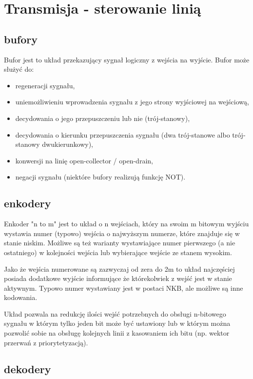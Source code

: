 \documentclass{pdfBooklets}
\begin{document}
\section{Transmisja - sterowanie linią}
\subsection{bufory}

Bufor jest to układ przekazujący sygnał logiczny z wejścia na wyjście. Bufor może służyć do:
\begin{itemize}
\item regeneracji sygnału,
\item uniemożliwieniu wprowadzenia sygnału z jego strony wyjściowej na wejściową,
\item decydowania o jego przepuszczeniu lub nie (trój-stanowy),
\item decydowania o kierunku przepuszczenia sygnału (dwa trój-stanowe albo trój-stanowy dwukierunkowy),
\item konwersji na linię open-collector / open-drain,
\item negacji sygnału (niektóre bufory realizują funkcję NOT).
\end{itemize}

\subsection{enkodery}

Enkoder "n to m" jest to układ o n wejściach, który na swoim m bitowym wyjściu wystawia numer (typowo) wejścia o najwyższym numerze, które znajduje się w stanie niskim. Możliwe są też warianty wystawiające numer pierwszego (a nie ostatniego) w kolejności wejścia lub wybierające wejście ze stanem wysokim.

Jako że wejścia numerowane są zazwyczaj od zera do 2m to układ najczęściej posiada dodatkowe wyjście informujące że którekolwiek z wejść jest w stanie aktywnym. Typowo numer wystawiany jest w postaci NKB, ale możliwe są inne kodowania.

Układ pozwala na redukcję ilości wejść potrzebnych do obsługi n-bitowego sygnału w którym tylko jeden bit może być ustawiony lub w którym można pozwolić sobie na obsługę kolejnych linii z kasowaniem ich bitu (np. wektor przerwań z priorytetyzacją).

\subsection{dekodery}
\end{document}
